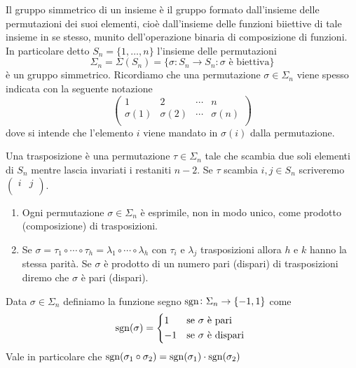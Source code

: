
\begin{definition}
	Il gruppo simmetrico di un insieme è il gruppo formato dall'insieme delle permutazioni dei suoi elementi, cioè dall'insieme delle funzioni biiettive di tale insieme in se stesso, munito dell'operazione binaria di composizione di funzioni. \\
	In particolare detto $ S_n = \{1, \ldots, n\} $ l'insieme delle permutazioni \[\Sigma_n = \Sigma (S_n) = \{\sigma \colon S_n \to S_n : \sigma \text{ è biettiva}\}\] è un gruppo simmetrico. Ricordiamo che una permutazione $ \sigma \in \Sigma_n $ viene spesso indicata con la seguente notazione 
	\[\begin{pmatrix}
	1 & 2 & \cdots & n \\
	\sigma (1) & \sigma (2) & \cdots & \sigma (n) \\
	\end{pmatrix}\]
	dove si intende che l'elemento $ i $ viene mandato in $ \sigma (i) $ dalla permutazione. 
\end{definition}

\begin{definition}[trasposizione]
	Una trasposizione è una permutazione $ \tau \in \Sigma_n $ tale che scambia due soli elementi di $ S_n $ mentre lascia invariati i restaniti $ n - 2 $. Se $ \tau $ scambia $ i, j \in S_n $ scriveremo $ \begin{pmatrix}
	i & j \\
	\end{pmatrix} $. 
\end{definition}

\begin{prop}
	\begin{enumerate}[label = (\roman*)]
		\item Ogni permutazione $ \sigma \in \Sigma_n $ è esprimile, non in modo unico, come prodotto (composizione) di trasposizioni. 
		\item Se $ \sigma = \tau_1 \circ \cdots \circ \tau_h = \lambda_1 \circ \cdots \circ \lambda_h $ con $ \tau_i $ e $ \lambda_j $ trasposizioni allora $ h $ e $ k $ hanno la stessa parità. Se $ \sigma $ è prodotto di un numero pari (dispari) di trasposizioni diremo che $ \sigma $ è pari (dispari). 
	\end{enumerate}
\end{prop}

\begin{definition}
	Data $ \sigma \in \Sigma_n $ definiamo la funzione segno $ \operatorname{sgn} \colon \Sigma_n \to \{-1, 1\} $ come 
	\[\sgn(\sigma) = 
	\begin{cases*}
	1 & se $ \sigma $ è pari \\
	-1 & se $ \sigma $ è dispari \\
	\end{cases*}\]
	Vale in particolare che $ \operatorname{sgn}(\sigma_1 \circ \sigma_2) = \operatorname{sgn}(\sigma_1) \cdot \operatorname{sgn}(\sigma_2) $
\end{definition}

